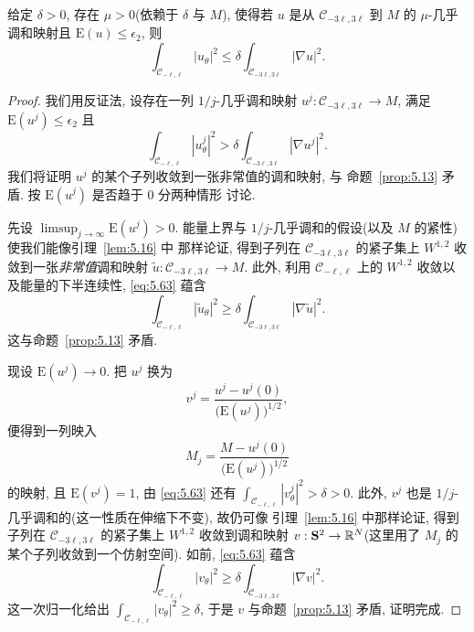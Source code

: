 \begin{lemma}
\label{lem:5.19}
给定 $\delta>0$, 存在 $\mu>0$(依赖于 $\delta$ 与 $M$), 使得若 $u$ 是从
$\mathcal{C}_{-3\ell,3\ell}$ 到 $M$ 的 $\mu$-几乎调和映射且
$\mathrm{E}(u)\leq\epsilon_2$, 则
\begin{equation}
\int_{\mathcal{C}_{-\ell,\ell}}|u_\theta|^2
\leq\delta\int_{\mathcal{C}_{-3\ell,3\ell}}|\nabla u|^2.
\label{eq:5.62}
\end{equation}
\end{lemma}

\begin{proof}
我们用反证法, 设存在一列 $1/j$-几乎调和映射
$u^j:\mathcal{C}_{-3\ell,3\ell}\to M$, 满足
$\mathrm{E}(u^j)\leq\epsilon_2$ 且
\begin{equation}
\int_{\mathcal{C}_{-\ell,\ell}}|u_\theta^j|^2
>\delta\int_{\mathcal{C}_{-3\ell,3\ell}}|\nabla u^j|^2.
\label{eq:5.63}
\end{equation}
我们将证明 $u^j$ 的某个子列收敛到一张非常值的调和映射, 与
命题~\ref{prop:5.13} 矛盾. 按 $\mathrm{E}(u^j)$ 是否趋于 $0$ 分两种情形
讨论.

先设 $\limsup_{j\to\infty}\mathrm{E}(u^j)>0$. 能量上界与
$1/j$-几乎调和的假设(以及 $M$ 的紧性)使我们能像引理~\ref{lem:5.16} 中
那样论证, 得到子列在 $\mathcal{C}_{-3\ell,3\ell}$ 的紧子集上 $W^{1,2}$
收敛到一张\emph{非常值}调和映射
$\tilde{u}:\mathcal{C}_{-3\ell,3\ell}\to M$. 此外, 利用
$\mathcal{C}_{-\ell,\ell}$ 上的 $W^{1,2}$ 收敛以及能量的下半连续性,
\eqref{eq:5.63} 蕴含
\begin{equation}
\int_{\mathcal{C}_{-\ell,\ell}}|\tilde{u}_\theta|^2
\geq\delta\int_{\mathcal{C}_{-3\ell,3\ell}}|\nabla\tilde{u}|^2.
\label{eq:5.64}
\end{equation}
这与命题~\ref{prop:5.13} 矛盾.

现设 $\mathrm{E}(u^j)\to 0$. 把 $u^j$ 换为
\begin{equation}
v^j=\frac{u^j-u^j(0)}{\bigl(\mathrm{E}(u^j)\bigr)^{1/2}},
\label{eq:5.65}
\end{equation}
便得到一列映入
\begin{equation}
M_j=\frac{M-u^j(0)}{\bigl(\mathrm{E}(u^j)\bigr)^{1/2}}
\label{eq:5.66}
\end{equation}
的映射, 且 $\mathrm{E}(v^j)=1$, 由 \eqref{eq:5.63} 还有
$\int_{\mathcal{C}_{-\ell,\ell}}|v_\theta^j|^2>\delta>0$. 此外, $v^j$
也是 $1/j$-几乎调和的(这一性质在伸缩下不变), 故仍可像
引理~\ref{lem:5.16} 中那样论证, 得到子列在
$\mathcal{C}_{-3\ell,3\ell}$ 的紧子集上 $W^{1,2}$ 收敛到调和映射
$v:\mathbf{S}^2\to\mathbb{R}^N$(这里用了 $M_j$ 的某个子列收敛到一个仿射空间).
如前, \eqref{eq:5.63} 蕴含
\begin{equation}
\int_{\mathcal{C}_{-\ell,\ell}}|v_\theta|^2
\geq\delta\int_{\mathcal{C}_{-3\ell,3\ell}}|\nabla v|^2.
\label{eq:5.67}
\end{equation}
这一次归一化给出 $\int_{\mathcal{C}_{-\ell,\ell}}|v_\theta|^2\geq\delta$,
于是 $v$ 与命题~\ref{prop:5.13} 矛盾, 证明完成.
\end{proof}

